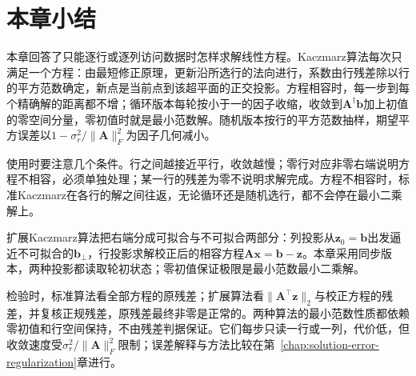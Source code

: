 \section{本章小结}
\label{sec:row-projection-summary}

本章回答了只能逐行或逐列访问数据时怎样求解线性方程。Kaczmarz算法每次只满足一个方程：由最短修正原理，更新沿所选行的法向进行，系数由行残差除以行的平方范数确定，新点是当前点到该超平面的正交投影。方程相容时，每一步到每个精确解的距离都不增；循环版本每轮按小于一的因子收缩，收敛到$\bm A^\dagger\bm b$加上初值的零空间分量，零初值时就是最小范数解。随机版本按行的平方范数抽样，期望平方误差以$1-\sigma_r^2/\lVert\bm A\rVert_F^2$为因子几何减小。

使用时要注意几个条件。行之间越接近平行，收敛越慢；零行对应非零右端说明方程不相容，必须单独处理；某一行的残差为零不说明求解完成。方程不相容时，标准Kaczmarz在各行的解之间往返，无论循环还是随机选行，都不会停在最小二乘解上。

扩展Kaczmarz算法把右端分成可拟合与不可拟合两部分：列投影从$\bm z_0=\bm b$出发逼近不可拟合的$\bm b_\perp$，行投影求解校正后的相容方程$\bm A\bm x=\bm b-\bm z$。本章采用同步版本，两种投影都读取轮初状态；零初值保证极限是最小范数最小二乘解。

检验时，标准算法看全部方程的原残差；扩展算法看$\lVert\bm A^\top\bm z\rVert_2$与校正方程的残差，并复核正规残差，原残差最终非零是正常的。两种算法的最小范数性质都依赖零初值和行空间保持，不由残差判据保证。它们每步只读一行或一列，代价低，但收敛速度受$\sigma_r^2/\lVert\bm A\rVert_F^2$限制；误差解释与方法比较在第~\ref{chap:solution-error-regularization}章进行。
